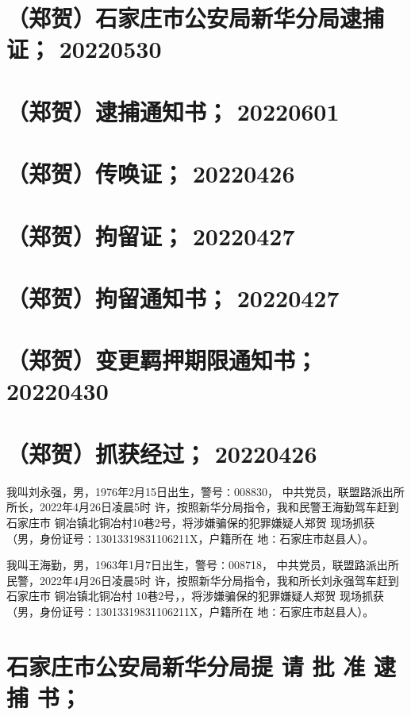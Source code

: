 \section{
    （郑贺）石家庄市公安局新华分局逮捕证；
    20220530
}
\section{
    （郑贺）逮捕通知书；
    20220601
}
\section{
    （郑贺）传唤证；
    20220426
}
\section{
    （郑贺）拘留证；
    20220427
}
\section{
    （郑贺）拘留通知书；
    20220427
}
\section{
    （郑贺）变更羁押期限通知书；
    20220430
}
\section{
    （郑贺）抓获经过；
    20220426
}
我叫刘永强，男，1976年2月15日出生，警号∶008830，
中共党员，联盟路派出所所长，2022年4月26日凌晨5时
许，按照新华分局指令，我和民警王海勤驾车赶到石家庄市
铜冶镇北铜冶村10巷2号，将涉嫌骗保的犯罪嫌疑人郑贺
现场抓获（男，身份证号∶13013319831106211X，户籍所在
地∶石家庄市赵县人）。

我叫王海勤，男，1963年1月7日出生，警号∶008718，
中共党员，联盟路派出所民警，2022年4月26日凌晨5时
许，按照新华分局指令，我和所长刘永强驾车赶到石家庄市
铜冶镇北铜冶村 10巷2号，，将涉嫌骗保的犯罪嫌疑人郑贺
现场抓获（男，身份证号∶13013319831106211X，户籍所在
地∶石家庄市赵县人）。

\section{
    石家庄市公安局新华分局提 请 批 准 逮 捕 书；
}
